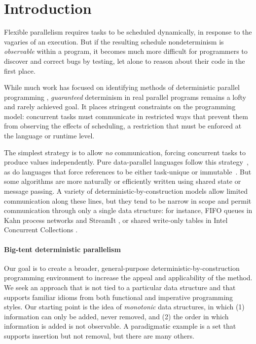 \section{Introduction} \label{section:intro}


Flexible parallelism requires tasks to be scheduled dynamically, in response to
the vagaries of an execution.  But if the resulting schedule nondeterminism is
\emph{observable} within a program, it becomes much more difficult for
programmers to discover and correct bugs by testing, let alone to reason about
their code in the first place.

While much work has focused on identifying methods of deterministic parallel
programming \cite{CnC, concurrent-revisions-haskell11, dpj-oopsla,
  Kahn-1974,Lee-sdn,Tesler-1968}, {\em guaranteed} determinism in real parallel
programs remains a lofty and rarely achieved goal.  It places stringent
constraints on the programming model: concurrent tasks must communicate in
restricted ways that prevent them from observing the effects of scheduling, a
restriction that must be enforced at the language or runtime level.

The simplest strategy is to allow \emph{no} communication, forcing
concurrent tasks to produce values independently.  Pure data-parallel languages
follow this strategy~\cite{dph}, as do languages that force references to be
either task-unique or immutable~\cite{dpj-oopsla}.  But some algorithms are
more naturally or efficiently written using shared state or message passing.  A
variety of deterministic-by-construction models allow limited communication
along these lines, but they tend to be narrow in scope and 
permit communication through only a
single data structure: for instance, FIFO queues in Kahn process networks
\cite{Kahn-1974} and StreamIt \cite{streamit-asplos}, or shared write-only
tables in Intel Concurrent Collections \cite{CnC}.

\paragraph{Big-tent deterministic parallelism}

Our goal is to create a broader, general-purpose deterministic-by-construction
programming environment to increase the appeal and applicability of the method.
We seek an approach that is not tied to a particular data structure and that
supports familiar idioms from both functional and imperative programming styles.
Our starting point is the idea of \emph{monotonic} data structures,
in which (1) information can only be added, never removed, and (2) the order in
which information is added is not observable.  A paradigmatic example is a set
that supports insertion but not removal, but there are many others.  


